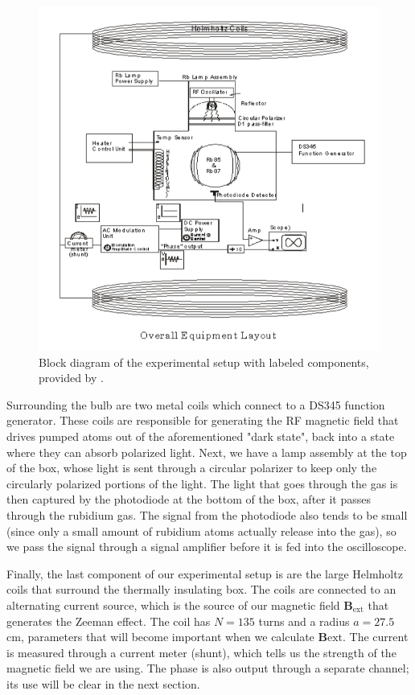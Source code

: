 \documentclass[10pt]{article}
\begin{document}
	\begin{figure}[h]
		\centering
		\includegraphics[scale=0.5]{images/setup.png}
		\caption{Block diagram of the experimental setup with labeled components,
		provided by \cite{lab-manual}.}
		\label{setup}
	\end{figure}

	Surrounding the bulb are two metal coils which connect to a DS345 function
	generator. These coils are responsible for generating the RF magnetic field that
	drives pumped atoms out of the aforementioned "dark state", back into a state
	where they can absorb polarized light. Next, we have a lamp assembly at the 
	top of the box, whose
	light is sent through a circular polarizer to keep only the circularly polarized
	portions of the light. The light that goes through the gas is then captured by
	the photodiode at the bottom of the box, after it passes through the rubidium
	gas. The signal from the photodiode also tends to be small (since only a small
	amount of rubidium atoms actually release into the gas), so we pass the signal
	through a signal amplifier before it is fed into the oscilloscope.          

	Finally, the last component of our experimental setup is are the large Helmholtz
	coils that surround the thermally insulating box. The coils are connected to an
	alternating current source, which is the source of our magnetic field \(
	\mathbf{B}_\text{ext} \) that generates the Zeeman effect. The coil has \( N =
	135 \) turns and a radius \( a = 27.5 \) cm, parameters that will become
	important when we calculate \( \mathbf{B}\text{ext} \). 
	The current is measured through a current meter (shunt), 
	which tells us the strength of the magnetic
	field we are using. The phase is also output through a separate channel; its use
	will be clear in the next section.  
\end{document}
